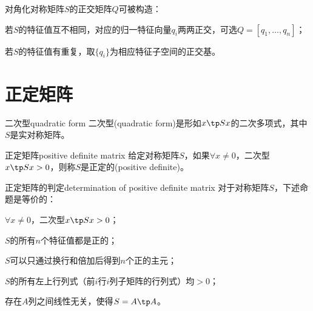 
\begin{remark}
	对角化对称矩阵$S$的正交矩阵$Q$可被构造：
	\begin{compactitem}
		\item 若$S$的特征值互不相同，对应的归一特征向量$q_i$两两正交，可选$Q=[q_1,\ldots,q_n]$；
		\item 若$S$的特征值有重复，取$\{q_i\}$为相应特征子空间的正交基。
	\end{compactitem}
\end{remark}

\section{正定矩阵}

\begin{definition}{二次型}{quadratic form}
	二次型(quadratic form)是形如$x\tp Sx$的二次多项式，其中$S$是实对称矩阵。
\end{definition}
\begin{definition}{正定矩阵}{positive definite matrix}
	给定对称矩阵$S$，如果$\forall x\neq 0$，二次型$x\tp Sx>0$，则称$S$是正定的(positive definite)。
\end{definition}
\begin{theorem}{正定矩阵的判定}{determination of positive definite matrix}
	对于对称矩阵$S$，下述命题是等价的：
	\begin{compactenum}
		\item $\forall x\neq 0$，二次型$x\tp Sx>0$；
		\item $S$的所有$n$个特征值都是正的；
		\item $S$可以只通过换行和倍加后得到$n$个正的主元；
		\item $S$的所有左上行列式（前$i$行$i$列子矩阵的行列式）均$>0$；
		\item 存在$A$列之间线性无关，使得$S=A\tp A$。
	\end{compactenum}
\end{theorem}
